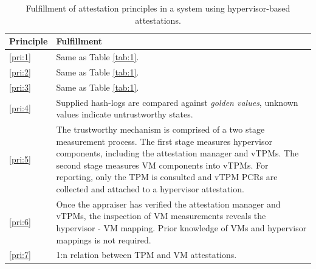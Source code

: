 \begin{table}
\caption{Fulfillment of attestation principles in a system using hypervisor-based attestations.}
\label{tab:2}
\centering
\begin{tabular}{p{1cm}|p{}} %
 \toprule
 Principle & Fulfillment \\
 \midrule
 \ref{pri:1} & Same as Table \ref{tab:1}.\\
 \midrule
 \ref{pri:2} & Same as Table \ref{tab:1}.\\
 \midrule
 \ref{pri:3} & Same as Table \ref{tab:1}.\\
 
 \midrule
 \ref{pri:4} & Supplied hash-logs are compared against \emph{golden values}, unknown values indicate untrustworthy states.\\
 \midrule
 \ref{pri:5} & The trustworthy mechanism is comprised of a two stage measurement process. The first stage measures hypervisor components, including the attestation manager and vTPMs. The second stage measures VM components into vTPMs. For reporting, only the TPM is consulted and vTPM PCRs are collected and attached to a hypervisor attestation.\\
 \midrule
 \ref{pri:6} & Once the appraiser has verified the attestation manager and vTPMs, the inspection of VM measurements reveals the hypervisor - VM mapping. Prior knowledge of VMs and hypervisor mappings is not required.\\
 \midrule
 \ref{pri:7} & 1:n relation between TPM and VM attestations. \\
 \bottomrule
\end{tabular}
\end{table}

